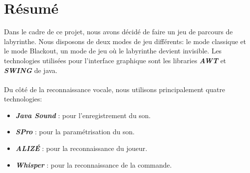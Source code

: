 \section{Résumé}
\label{sec:resume}

Dans le cadre de ce projet, nous avons décidé de faire un jeu de parcours de labyrinthe. Nous disposons de deux modes de jeu différents: le mode classique et le mode Blackout,
un mode de jeu où le labyrinthe devient invisible. Les technologies utilisées pour l'interface graphique sont les libraries \textbf{\textit{AWT}} et \textbf{\textit{SWING}} de java. \\\\
Du côté de la reconnaissance vocale, nous utilisons principalement quatre technologies:
\begin{itemize}
    \item \textbf{\textit{Java Sound}} : pour l'enregistrement du son.
    \item \textbf{\textit{SPro}} : pour la paramétrisation du son.
    \item \textbf{\textit{ALIZÉ}} : pour la reconnaissance du joueur.
    \item \textbf{\textit{Whisper}} : pour la reconnaissance de la commande.
\end{itemize}
